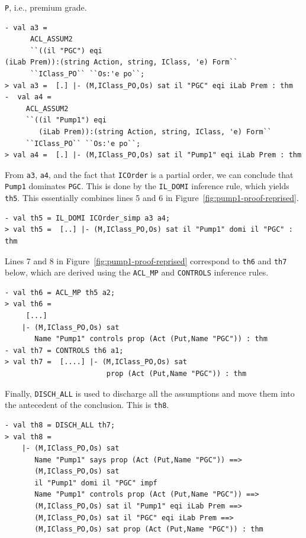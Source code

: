 \texttt{P}, i.e., premium grade.
\begin{session}
\begin{footnotesize}
\begin{verbatim}
- val a3 =
      ACL_ASSUM2
      ``((il "PGC") eqi 
(iLab Prem)):(string Action, string, IClass, 'e) Form`` 
      ``IClass_PO`` ``Os:'e po``;
> val a3 =  [.] |- (M,IClass_PO,Os) sat il "PGC" eqi iLab Prem : thm
-  val a4 = 
     ACL_ASSUM2
     ``((il "Pump1") eqi 
        (iLab Prem)):(string Action, string, IClass, 'e) Form`` 
     ``IClass_PO`` ``Os:'e po``;
> val a4 =  [.] |- (M,IClass_PO,Os) sat il "Pump1" eqi iLab Prem : thm
\end{verbatim}
\end{footnotesize}
\end{session}
From \texttt{a3}, \texttt{a4}, and the fact that \texttt{ICOrder} is
a partial order, we can conclude that \texttt{Pump1} dominates
\texttt{PGC}. This is done by the \texttt{IL\_DOMI} inference rule,
which yields \texttt{th5}. This essentially combines lines 5 and 6 in
Figure~\ref{fig:pump1-proof-reprised}.
\begin{session}
  \begin{footnotesize}
\begin{verbatim}
- val th5 = IL_DOMI ICOrder_simp a3 a4;
> val th5 =  [..] |- (M,IClass_PO,Os) sat il "Pump1" domi il "PGC" : thm
\end{verbatim}
  \end{footnotesize}
\end{session}
Lines 7 and 8 in Figure~\ref{fig:pump1-proof-reprised} correspond to
\texttt{th6} and \texttt{th7} below, which are derived using the
\texttt{ACL\_MP} and \texttt{CONTROLS} inference rules.

\begin{session}
\begin{footnotesize}
\begin{verbatim}
- val th6 = ACL_MP th5 a2;
> val th6 =
     [...]
    |- (M,IClass_PO,Os) sat
       Name "Pump1" controls prop (Act (Put,Name "PGC")) : thm
- val th7 = CONTROLS th6 a1;
> val th7 =  [....] |- (M,IClass_PO,Os) sat 
                        prop (Act (Put,Name "PGC")) : thm
\end{verbatim}
\end{footnotesize}
\end{session}
Finally, \texttt{DISCH\_ALL} is used to discharge all the assumptions
and move them into the antecedent of the conclusion.  This is \texttt{th8}.
\begin{session}
  \begin{footnotesize}
\begin{verbatim}
- val th8 = DISCH_ALL th7;
> val th8 =
    |- (M,IClass_PO,Os) sat
       Name "Pump1" says prop (Act (Put,Name "PGC")) ==>
       (M,IClass_PO,Os) sat
       il "Pump1" domi il "PGC" impf
       Name "Pump1" controls prop (Act (Put,Name "PGC")) ==>
       (M,IClass_PO,Os) sat il "Pump1" eqi iLab Prem ==>
       (M,IClass_PO,Os) sat il "PGC" eqi iLab Prem ==>
       (M,IClass_PO,Os) sat prop (Act (Put,Name "PGC")) : thm
\end{verbatim}
  \end{footnotesize}
\end{session}

